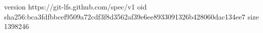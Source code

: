 version https://git-lfs.github.com/spec/v1
oid sha256:bca3fdfbbcef9509a72cdf3f8d3562af39e6ee8933091326b428060dac134ee7
size 1398246
